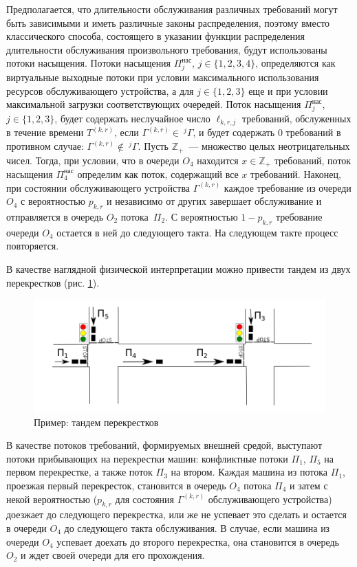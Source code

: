 \documentclass[a4paper,12pt,russian]{extarticle}
\newcommand{\G}{\Gamma}
\newcommand{\ga}[1]{\Gamma^{\left( #1 \right)} }
\newcommand{\Tt}[1]{T^{\left( #1 \right)} }
\begin{document}
Предполагается, что длительности обслуживания различных требований могут быть зависимыми и иметь различные законы распределения, поэтому вместо классического способа, состоящего в указании функции распределения длительности обслуживания произвольного требования, будут использованы потоки насыщения. Потоки насыщения $\Pi^{\mathrm{\text{нас}}}_j$, $j \in \{1,2,3,4\}$, определяются как виртуальные выходные потоки при 
условии максимального использования ресурсов обслуживающего устройства, а для $j\in \{1, 2, 3\}$ еще и при условии максимальной загрузки соответствующих очередей. Поток насыщения $\Pi^{\mathrm{\text{нас}}}_j$, $j\in \{1,2,3\}$, будет содержать неслучайное число $\ell_{k,r,j}$ требований, обслуженных в течение времени $\Tt{k,r}$, если $\ga{k,r} \in~^j\G$, и будет содержать $0$ требований в противном случае: $\ga{k,r} \notin ~^j\G$. Пусть $\mathbb{Z}_+$~--- множество целых неотрицательных чисел. Тогда, при условии, что в очереди $O_4$ находится $x \in \mathbb{Z}_+$ требований, поток насыщения $\Pi^{\mathrm{\text{нас}}}_4$ определим как поток, содержащий все $x$ требований.
Наконец, при состоянии обслуживающего устройства $\ga{k,r}$ каждое требование из очереди $O_4$ с вероятностью $p_{k,r}$ и независимо от других завершает обслуживание и отправляется в очередь $O_2$ потока~$\Pi_2$. С вероятностью $1-p_{k,r}$ требование очереди $O_4$ остается в ней до следующего такта. На следующем такте процесс повторяется.

В качестве наглядной физической интерпретации можно привести тандем из двух перекрестков (рис. \ref{crossroads}).
\begin{figure}[h]
\includegraphics[scale=0.5]{Crossroads.png} 
\caption{Пример: тандем перекрестков}
\label{crossroads}
\end{figure}
В качестве потоков требований, формируемых внешней средой, выступают потоки прибывающих на перекрестки машин: конфликтные потоки $\Pi_1$, $\Pi_5$ на первом перекрестке, а также поток $\Pi_3$ на втором. Каждая машина из потока $\Pi_1$, проезжая первый перекресток, становится в очередь $O_4$ потока $\Pi_4$ и затем с некой вероятностью ($p_{k,r}$ для состояния $\ga{k,r}$ обслуживающего устройства) доезжает до следующего перекрестка, или же не успевает это сделать и остается в очереди $O_4$ до следующего такта обслуживания. В случае, если машина из очереди $O_4$ успевает доехать до второго перекрестка, она становится в очередь $O_2$ и ждет своей очереди для его прохождения.
\end{document}
